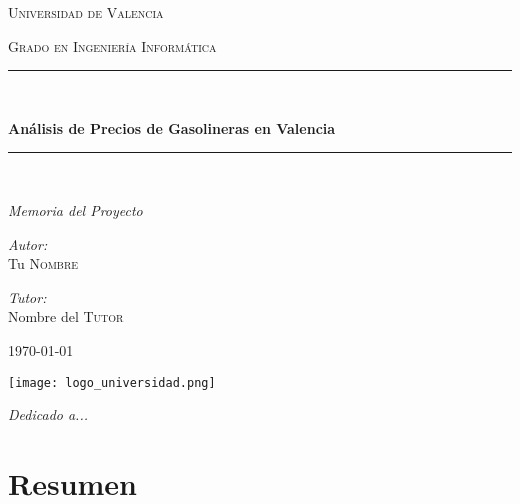 \begin{titlepage}
  \centering
  \vspace*{2cm}

  {\scshape\LARGE Universidad de Valencia \par}
  \vspace{1cm}
  {\scshape\Large Grado en Ingeniería Informática\par}
  \vspace{1.5cm}

  \rule{\linewidth}{0.5mm} \\[0.4cm]
  {\huge\bfseries Análisis de Precios de Gasolineras en Valencia\par}
  \rule{\linewidth}{0.5mm} \\[1cm]

  {\Large\itshape Memoria del Proyecto\par}
  \vfill

  \begin{minipage}[t]{0.4\textwidth}
    \begin{flushleft} \large
      \emph{Autor:}\\
      Tu \textsc{Nombre}
    \end{flushleft}
  \end{minipage}
  \begin{minipage}[t]{0.4\textwidth}
    \begin{flushright} \large
      \emph{Tutor:} \\
      Nombre del \textsc{Tutor}
    \end{flushright}
  \end{minipage}

  \vfill

  {\large \today\par}

  \vspace{1cm}
  \texttt{[image: logo\_universidad.png]}

\end{titlepage}

\cleardoublepage
\thispagestyle{empty}
\vspace*{\fill}
\begin{center}
  \textit{Dedicado a...}
\end{center}
\vspace*{\fill}

\cleardoublepage
\chapter*{Resumen}

